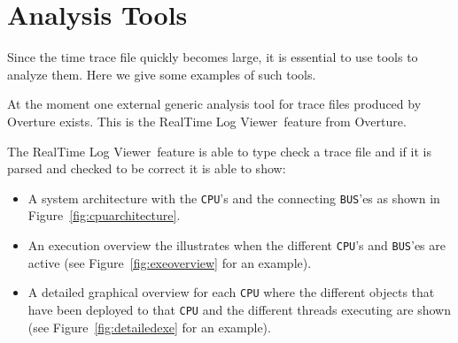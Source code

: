 \documentclass{overturerepchap}
\newcommand{\showtrace}{RealTime Log Viewer}
\begin{document}
\section{Analysis Tools}

Since the time trace file quickly becomes large, it is essential to
use tools to analyze them. Here we give some examples of such
tools. 


At the moment one external generic analysis tool for trace files produced by
Overture exists. This is the \showtrace\ feature from Overture.

The \showtrace\ feature is able to type check a trace file and if it 
is parsed and checked to be correct it is able to show:

\begin{itemize}
\item A system architecture with the \texttt{CPU}'s and the connecting
      \texttt{BUS}'es as shown in Figure~\ref{fig:cpuarchitecture}.
\item An execution overview the illustrates when the different 
      \texttt{CPU}'s and \texttt{BUS}'es are active (see 
      Figure~\ref{fig:exeoverview} for an example).
\item A detailed graphical overview for each \texttt{CPU} where the
      different objects that have been deployed to that \texttt{CPU} and
      the different threads executing are shown (see 
      Figure~\ref{fig:detailedexe} for an example).
\end{itemize}
\end{document}
